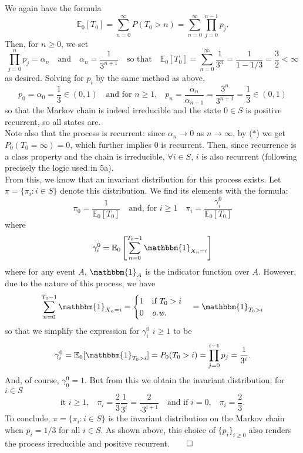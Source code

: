 \documentclass[11pt, letterpaper]{article}
\newcommand{\mbb}[1]{\mathbb{#1}}
\begin{document}
    We again have the formula 
    \[\mbb{E}_0\left[T_0\right]=\sum_{n=0}^\infty P(T_0>n)=\sum_{n=0}^\infty\prod_{j=0}^{n-1}p_j.\]
    Then, for $n\geq 0$, we set
    \[\prod_{j=0}^np_j=\alpha_n\quad\text{and}\quad\alpha_{n}=\frac{1}{3^{n+1}}\quad\text{so that}\quad\mbb{E}_0\left[T_0\right]=\sum_{n=0}^\infty\frac{1}{3^n}=\frac{1}{1-1/3}=\frac{3}{2}<\infty\]
    as desired. Solving for $p_i$ by the same method as above,
    \[p_0=\alpha_0=\frac{1}{3}\in(0,1)\quad\text{and for $n\geq 1$,}\quad p_n=\frac{\alpha_n}{\alpha_{n-1}}=\frac{3^n}{3^{n+1}}=\frac{1}{3}\in(0,1)\]
    so that the Markov chain is indeed irreducible and the state $0\in S$ is positive recurrent, so all states are.\\[10pt]
    Note also that the process is recurrent: since $\alpha_n\rightarrow 0$ as $n\rightarrow\infty$, by ($\ast$) we get $P_0(T_0=\infty)=0$, which further implies $0$ is recurrent. Then, since recurrence is a class property and the chain is irreducible, $\forall i\in S$, $i$ is also recurrent (following precisely the logic used in 5a).\\[10pt]
    From this, we know that an invariant distribution for this process exists. Let $\pi=\{\pi_i:i\in S\}$ denote this distribution. We find its elements with the formula:
    \[\pi_0=\frac{1}{\mbb{E}_0[T_0]}\quad\text{and, for $i\geq 1$}\quad\pi_i=\frac{\gamma^0_i}{\mbb{E}_0[T_0]}\]
    where 
    \[\gamma^0_i=\mbb{E}_0\left[\sum_{n=0}^{T_0-1}\mathbbm{1}_{X_n=i}\right]\]
    where for any event $A$, $\mathbbm{1}_A$ is the indicator function over $A$. However, due to the nature of this process,  we have
    \[\sum_{n=0}^{T_0-1}\mathbbm{1}_{X_n=i}=\begin{cases}
        1\quad\text{if $T_0>i$}\\
        0\quad\text{{\it o.w.}}
    \end{cases}=\mathbbm{1}_{T_0>i}\]
    so that we simplify the expression for $\gamma^0_i$ $i\geq 1$ to be
    \[\gamma^0_i=\mbb{E}_0[\mathbbm{1}_{T_0>i}]=P_0(T_0>i)=\prod_{j=0}^{i-1}p_j=\frac{1}{3^i}.\]
    And, of course, $\gamma_0^0=1$. But from this we obtain the invariant distribution; for $i\in S$
    \[\text{it $i\geq 1$,}\quad\pi_i=\frac{2}{3}\frac{1}{3^i}=\frac{2}{\cdot 3^{i+1}}\quad\text{and if $i=0$,}\quad\pi_i=\frac{2}{3}.\]
    To conclude, $\pi=\{\pi_i:i\in S\}$ is the invariant distribution on the Markov chain when $p_i=1/3$ for all $i\in S$. As shown above, this choice of $\{p_i\}_{i\geq 0}$ also renders the process irreducible and positive recurrent.\hfill{$\qed$}
\end{document}
